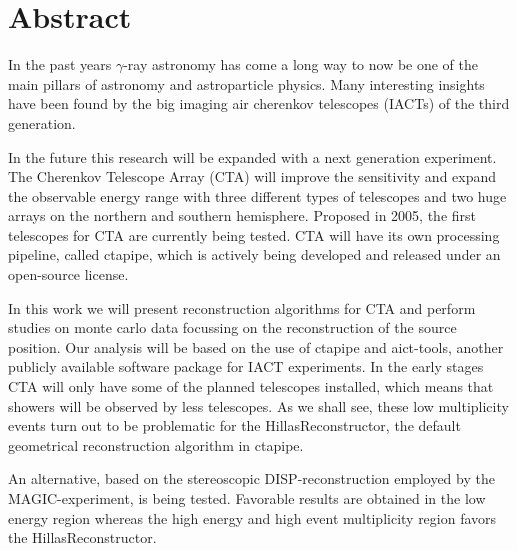 \thispagestyle{plain}

\iffalse
\section*{Kurzfassung}
\begin{otherlanguage}{german}
In den letzten Jahrzehnten hat die $\gamma$-Astronomie 
viele Erkenntnisse über die Zusammensetzung des Universums gebracht.
Mitverantwortlich dafür waren die großen Image Air Cherenkov Telescope (IACT)
Experimente der dritten Generation.
In Zukunft soll diese Forschung begleitet und erweitert werden 
durch ein Experiment der nächsten Generation.
Das Cherenkov-Teleskope-Array (CTA) wird die Sensitiviät weiter steigern und den
beobachtbaren Energiebereich erweitern.
In dieser Arbeit werden Rekonstruktionsalgorithmen für CTA vorgestellt und Studien auf 
Monte-Carlo-Daten durchgeführt mit dem Fokus auf der frühen Phase des Experimentes.
Zu Beginn werden nur wenige Teleskope errichtet sein, sodass Ereignisse nur 
mit wenigen Teleskopen gesehen werden.
\end{otherlanguage}
\fi

\section*{Abstract}
In the past years $\gamma$-ray astronomy has come a long way
to now be one of the main pillars of astronomy and astroparticle physics.
Many interesting insights have been found by the big imaging air cherenkov telescopes (IACTs) 
of the third generation.

In the future this research will be expanded with a next generation experiment.
The Cherenkov Telescope Array (CTA) will improve the sensitivity and
expand the observable energy range with 
three different types of telescopes and two huge arrays on the northern and 
southern hemisphere.
Proposed in 2005, the first telescopes for CTA are currently being tested.
CTA will have its own processing pipeline, called ctapipe, which is
actively being developed and released under an open-source license.

In this work we will present reconstruction algorithms for CTA and perform 
studies on monte carlo data focussing on the reconstruction of the source position.
Our analysis will be based on the use of ctapipe and 
aict-tools, another publicly available software package for IACT experiments.
In the early stages CTA will only have some of the planned telescopes installed,
which means that showers will be observed by less telescopes.
As we shall see, these low multiplicity events turn out to be problematic for
the HillasReconstructor,
the default geometrical reconstruction algorithm in ctapipe.

An alternative, based on the stereoscopic DISP-reconstruction employed by
the MAGIC-experiment, is being tested.
Favorable results are obtained in the low energy region whereas the
high energy and high event multiplicity region favors the HillasReconstructor.

